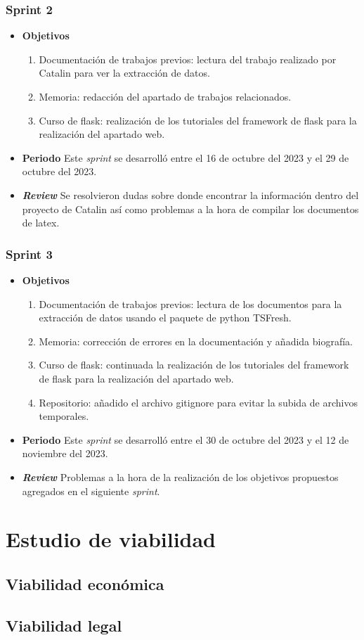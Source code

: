 \subsubsection{Sprint 2}
\begin{itemize}
\item \textbf{Objetivos}
\begin{enumerate}
\item Documentación de trabajos previos: lectura del trabajo realizado por Catalin para ver la extracción de datos.
\item Memoria: redacción del apartado de trabajos relacionados.
\item Curso de flask: realización de los tutoriales del framework de flask para la realización del apartado web.
\end{enumerate}
\item \textbf{Periodo}
Este \textsl{sprint} se desarrolló entre el 16 de octubre del 2023 y el 29 de octubre del 2023.
\item \textbf{\textsl{Review}}
Se resolvieron dudas sobre donde encontrar la información dentro del proyecto de Catalin así como problemas a la hora de compilar los documentos de latex. 


\end{itemize}
\subsubsection{Sprint 3}
\begin{itemize}
\item \textbf{Objetivos}
\begin{enumerate}
\item Documentación de trabajos previos: lectura de los documentos para la extracción de datos usando el paquete de python TSFresh.
\item Memoria: corrección de errores en la documentación y añadida biografía.
\item Curso de flask: continuada la realización de los tutoriales del framework de flask para la realización del apartado web.
\item Repositorio: añadido el archivo gitignore para evitar la subida de archivos temporales.
\end{enumerate}
\item \textbf{Periodo}
Este \textsl{sprint} se desarrolló entre el 30 de octubre del 2023 y el 12 de noviembre del 2023.
\item \textbf{\textsl{Review}}
Problemas a la hora de la realización de los objetivos propuestos agregados en el siguiente \textsl{sprint}. 


\end{itemize}


\section{Estudio de viabilidad}

\subsection{Viabilidad económica}

\subsection{Viabilidad legal}


